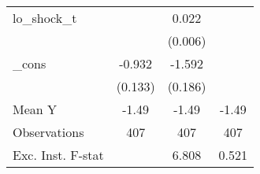 {\begin{tabular}{l*{3}{c}}
\addlinespace
lo\_shock\_t  &                     &       0.022\sym{***}&                     \\
            &                     &     (0.006)         &                     \\
\addlinespace
\_cons      &      -0.932\sym{***}&      -1.592\sym{***}&                     \\
            &     (0.133)         &     (0.186)         &                     \\
\midrule
Mean Y      &       -1.49         &       -1.49         &       -1.49         \\
Observations&         407         &         407         &         407         \\
Exc. Inst. F-stat&                     &       6.808         &       0.521         \\
\bottomrule
\end{tabular}
}
